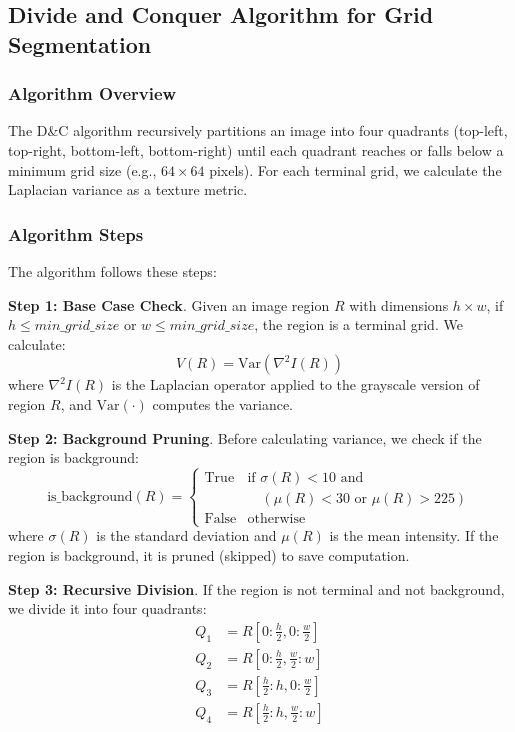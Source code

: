\documentclass[conference]{IEEEtran}
\begin{document}
\subsection{Divide and Conquer Algorithm for Grid Segmentation}

\subsubsection{Algorithm Overview}

The D\&C algorithm recursively partitions an image into four quadrants (top-left, top-right, bottom-left, bottom-right) until each quadrant reaches or falls below a minimum grid size (e.g., $64 \times 64$ pixels). For each terminal grid, we calculate the Laplacian variance as a texture metric.

\subsubsection{Algorithm Steps}

The algorithm follows these steps:

\textbf{Step 1: Base Case Check}. Given an image region $R$ with dimensions $h \times w$, if $h \leq min\_grid\_size$ or $w \leq min\_grid\_size$, the region is a terminal grid. We calculate:
\begin{equation}
    V(R) = \text{Var}(\nabla^2 I(R))
\end{equation}
where $\nabla^2 I(R)$ is the Laplacian operator applied to the grayscale version of region $R$, and $\text{Var}(\cdot)$ computes the variance.

\textbf{Step 2: Background Pruning}. Before calculating variance, we check if the region is background:
\begin{equation}
    \text{is\_background}(R) = \begin{cases}
        \text{True} & \text{if } \sigma(R) < 10 \text{ and } \\ 
        & \quad (\mu(R) < 30 \text{ or } \mu(R) > 225) \\
        \text{False} & \text{otherwise}
    \end{cases}
\end{equation}
where $\sigma(R)$ is the standard deviation and $\mu(R)$ is the mean intensity. If the region is background, it is pruned (skipped) to save computation.

\textbf{Step 3: Recursive Division}. If the region is not terminal and not background, we divide it into four quadrants:
\begin{equation}
    \begin{split}
        Q_1 &= R[0:\frac{h}{2}, 0:\frac{w}{2}] \\
        Q_2 &= R[0:\frac{h}{2}, \frac{w}{2}:w] \\
        Q_3 &= R[\frac{h}{2}:h, 0:\frac{w}{2}] \\
        Q_4 &= R[\frac{h}{2}:h, \frac{w}{2}:w]
    \end{split}
\end{equation}
\end{document}
